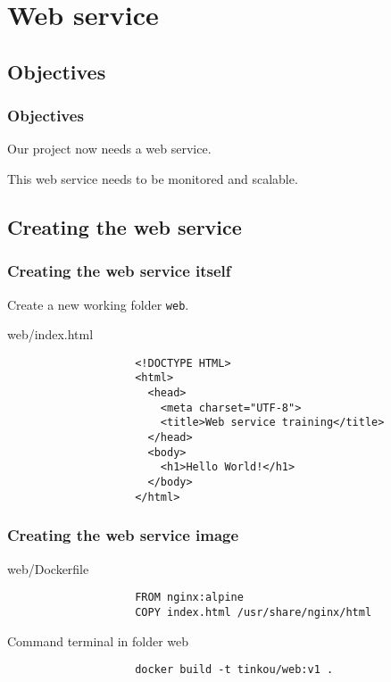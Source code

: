 \section{Web service}

\subsection{Objectives}

	\begin{frame}
		\frametitle{Objectives}
		
		Our project now needs a web service.

		\bigskip
		This web service needs to be monitored and scalable.		
		
	\end{frame}
	
\subsection{Creating the web service}
	\begin{frame}[fragile]
		\frametitle{Creating the web service itself}
		
		Create a new working folder \verb!web!.

		\begin{block}{web/index.html}
			\begin{small}
				\begin{verbatim}
					<!DOCTYPE HTML>
					<html>
					  <head>
					    <meta charset="UTF-8">
					    <title>Web service training</title>
					  </head>
					  <body>
					    <h1>Hello World!</h1>
					  </body>
					</html>
				\end{verbatim}
			\end{small}
		\end{block}			
	\end{frame}
	
	\begin{frame}[fragile]
		\frametitle{Creating the web service image}
		
		\begin{block}{web/Dockerfile}
			\begin{small}
				\begin{verbatim}
					FROM nginx:alpine
					COPY index.html /usr/share/nginx/html
				\end{verbatim}
			\end{small}
		\end{block}
		
		\begin{block}{Command terminal in folder web}
			\begin{small}
				\begin{verbatim}
					docker build -t tinkou/web:v1 .
				\end{verbatim}
			\end{small}
		\end{block}
		
	\end{frame}
	
